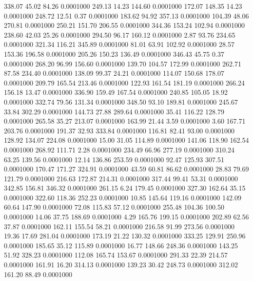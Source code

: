  338.07   45.02   84.26   0.0001000
 249.13   14.23  144.60   0.0001000
 172.07  148.35   14.23   0.0001000
 248.72   12.51    0.37   0.0001000
 183.62   94.92  357.13   0.0001000
 104.39   48.06  270.81   0.0001000
 250.21  151.70  206.55   0.0001000
 344.36  153.24  102.94   0.0001000
 238.60   42.03   25.26   0.0001000
 294.50   96.17  160.12   0.0001000
   2.87   93.76  234.65   0.0001000
 321.34  116.21  345.89   0.0001000
  81.01   63.91  102.92   0.0001000
  28.57  153.36  196.58   0.0001000
 205.26  150.23  136.49   0.0001000
 346.43   45.75    0.37   0.0001000
 268.20   96.99  156.60   0.0001000
 139.70  104.57  172.99   0.0001000
 262.71   87.58  234.40   0.0001000
 138.09   99.37   24.21   0.0001000
 114.07  150.68  178.07   0.0001000
 209.79  165.54  213.46   0.0001000
 122.93  161.54  181.19   0.0001000
 266.24  156.18   13.47   0.0001000
 336.90  159.49  167.54   0.0001000
 240.85  105.05   18.92   0.0001000
 332.74   79.56  131.34   0.0001000
 348.50   93.10  189.81   0.0001000
 245.67   33.84  302.29   0.0001000
 144.73   27.88  289.64   0.0001000
  35.41  116.22  128.79   0.0001000
 265.58   35.27  213.07   0.0001000
 163.99   21.44    3.59   0.0001000
   3.60  167.71  203.76   0.0001000
 191.37   32.93  333.84   0.0001000
 116.81   82.41   93.00   0.0001000
 128.92  134.07  224.08   0.0001000
  15.00   31.05  114.89   0.0001000
 141.06  118.90  162.54   0.0001000
 268.92  111.71    2.28   0.0001000
 234.49   66.96  277.19   0.0001000
 310.24   63.25  139.56   0.0001000
  12.14  136.86  253.59   0.0001000
  92.47  125.93  307.51   0.0001000
 170.47  171.27  324.91   0.0001000
  43.59   60.81   86.62   0.0001000
  28.83   79.69  121.79   0.0001000
 216.63  172.87  214.31   0.0001000
 317.44   99.41   53.31   0.0001000
 342.85  156.81  346.32   0.0001000
 261.15    6.24  179.45   0.0001000
 327.30  162.64   35.15   0.0001000
 322.60  118.36  252.23   0.0001000
  10.85  145.64  119.16   0.0001000
 142.09   60.64  147.90   0.0001000
  72.08  115.83   57.12   0.0001000
 255.48  104.36  100.50   0.0001000
  14.06   37.75  188.69   0.0001000
   4.29  165.76  199.15   0.0001000
 202.89   62.56   37.87   0.0001000
 162.11  155.54   58.21   0.0001000
 216.58   91.99  273.56   0.0001000
  19.36   17.69  281.04   0.0001000
 173.19   21.22  130.32   0.0001000
 333.25  129.91  250.96   0.0001000
 185.65   35.12  115.89   0.0001000
  16.77  148.66  248.36   0.0001000
 143.25   51.92  328.23   0.0001000
 112.08  165.74  153.67   0.0001000
 291.33   22.39  214.57   0.0001000
 161.91   16.20  314.13   0.0001000
 139.23   30.42  248.73   0.0001000
 312.02  161.20   88.49   0.0001000
